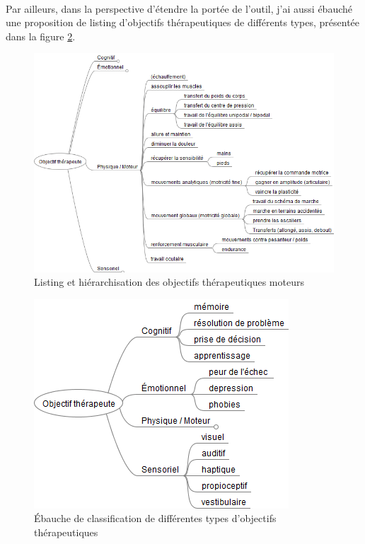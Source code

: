 \paragraph{}Par ailleurs, dans la perspective d'étendre la portée de l'outil, j'ai aussi ébauché une proposition de listing d'objectifs thérapeutiques de différents types, présentée dans la figure \ref{objectifs_autres}.

\begin{figure}[hbtp]
	\centering
	\includegraphics[width=16cm]{images/objectifs_moteurs}
	\caption{Listing et hiérarchisation des objectifs thérapeutiques moteurs}
	\label{objectifs_moteurs}
\end{figure}

\begin{figure}[hbtp]
	\centering
	\includegraphics[scale=0.7]{images/objectifs_autres}
	\caption{Ébauche de classification de différentes types d'objectifs thérapeutiques}
	\label{objectifs_autres}
\end{figure}

